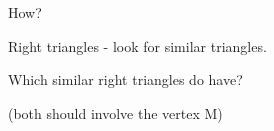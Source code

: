 



How?





Right triangles - look for similar triangles.


Which similar right triangles do have?

(both should involve the vertex M)










